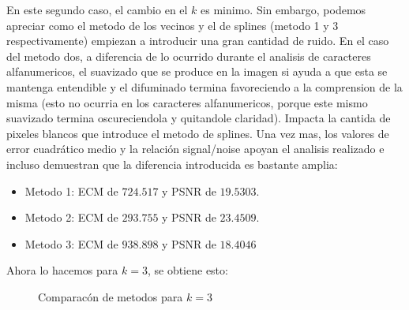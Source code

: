 En este segundo caso, el cambio en el $k$ es minimo. Sin embargo, podemos apreciar como el metodo de los vecinos y el de splines (metodo 1 y 3 respectivamente) empiezan a introducir una gran cantidad de ruido. En el caso del metodo dos, a diferencia de lo ocurrido durante el analisis de caracteres alfanumericos, el suavizado que se produce en la imagen si ayuda a que esta se mantenga entendible y el difuminado termina favoreciendo a la comprension de la misma (esto no ocurria en los caracteres alfanumericos, porque este mismo suavizado termina oscureciendola y quitandole claridad). Impacta la cantida de pixeles blancos que introduce el metodo de splines.
Una vez mas, los valores de error cuadrático medio y la relación signal/noise apoyan el analisis realizado e incluso demuestran que la diferencia introducida es bastante amplia:
\begin{itemize}
 \item Metodo 1: ECM de $724.517$ y PSNR de $19.5303$.
 \item Metodo 2: ECM de $293.755$ y PSNR de $23.4509$.
 \item Metodo 3: ECM de $938.898$ y PSNR de $18.4046$
\end{itemize}


Ahora lo hacemos para $k=3$, se obtiene esto:
\begin{figure}[H]
    \centering
    \qquad
    \qquad
    \caption{Comparacón de metodos para $k = 3$}%
    \label{fig:example}%
\end{figure}

